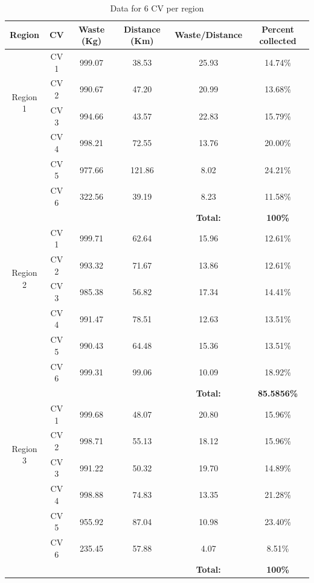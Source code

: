 \documentclass[12pt]{article}
\begin{document}
\begin{table}[H]
    \centering
    \caption{ Data for 6 CV per region} \label{tab2}
    \vspace*{0.3cm}
    \begin{tabular}{|c|c|c|c|c|c|}
        \hline Region & CV & Waste (Kg) & Distance (Km) & Waste/Distance & Percent collected \\
        \hline \multirow{4}{*}{Region 1} & CV 1 & 999.07& 38.53 & 25.93 &14.74\% \\
        \cline{2-6}& CV 2 & 990.67 & 47.20 & 20.99 & 13.68\%\\        
        \cline{2-6}& CV 3 & 994.66 & 43.57 & 22.83 & 15.79\%\\        
        \cline{2-6}& CV 4 & 998.21 & 72.55 & 13.76 & 20.00\%\\      
        \cline{2-6}& CV 5 & 977.66 & 121.86 & 8.02 & 24.21\%\\      
        \cline{2-6}& CV 6 & 322.56 & 39.19 & 8.23 & 11.58\%\\
        \hline & & & &\textbf{Total:} &\textbf{100\%}\\
        \hline \multirow{4}{*}{Region 2} & CV 1 & 999.71 & 62.64 & 15.96 & 12.61\% \\
        \cline{2-6}& CV 2 & 993.32 & 71.67 & 13.86 & 12.61\%\\        
        \cline{2-6}& CV 3 & 985.38 & 56.82 & 17.34 & 14.41\%\\        
        \cline{2-6}& CV 4 & 991.47 & 78.51 & 12.63 & 13.51\%\\        
        \cline{2-6}& CV 5 & 990.43 & 64.48 & 15.36 & 13.51\%\\        
        \cline{2-6}& CV 6 & 999.31 & 99.06 & 10.09 & 18.92\%\\
        \hline & & & &\textbf{Total:} &\textbf{85.5856\%}\\     
        \hline \multirow{4}{*}{Region 3} & CV 1 & 999.68 & 48.07 & 20.80 & 15.96\% \\
        \cline{2-6}& CV 2 & 998.71 & 55.13 & 18.12 & 15.96\%\\        
        \cline{2-6}& CV 3 & 991.22 & 50.32 & 19.70 & 14.89\%\\        
        \cline{2-6}& CV 4 & 998.88 & 74.83 & 13.35 & 21.28\%\\      
        \cline{2-6}& CV 5 & 955.92 & 87.04 & 10.98 & 23.40\%\\      
        \cline{2-6}& CV 6 & 235.45 & 57.88 & 4.07 & 8.51\%\\
        \hline & & & &\textbf{Total:} &\textbf{100\%}\\
        \hline      
    \end{tabular}
\end{table}
\end{document}
